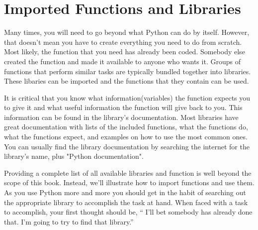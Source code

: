 \section{Imported Functions and Libraries}
Many times, you will need to go beyond what Python can do by itself. However, that doesn't mean you have to create everything you need to do from scratch.  Most likely, the function that you need has already been coded. Somebody
else created the function and made it available to anyone
who wants it.  Groups of functions that perform similar tasks are
typically bundled together into libraries. These libaries can be
imported and the functions that they contain can be used.

It is critical that you know what information(variables) the function expects you to give it and what
useful information the function will give back to you.  This
information can be found in the library's documentation. Most libraries have great documentation with lists of the included functions, what the functions do, what the functions expect, and examples on how to use the most common ones.  You can usually find the library documentation by searching the internet for the library's name, plus "Python documentation".

Providing a complete list of all available libraries and function is well beyond
the scope of this book. Instead, we'll illustrate how to import
functions and use them.  As you use Python more and more you
should get in the habit of searching out the appropriate library to
accomplish the task at hand. When faced with a task to accomplish,
your first thought should be, `` I'll bet somebody has already done that.
I'm going to try to find that library.''



